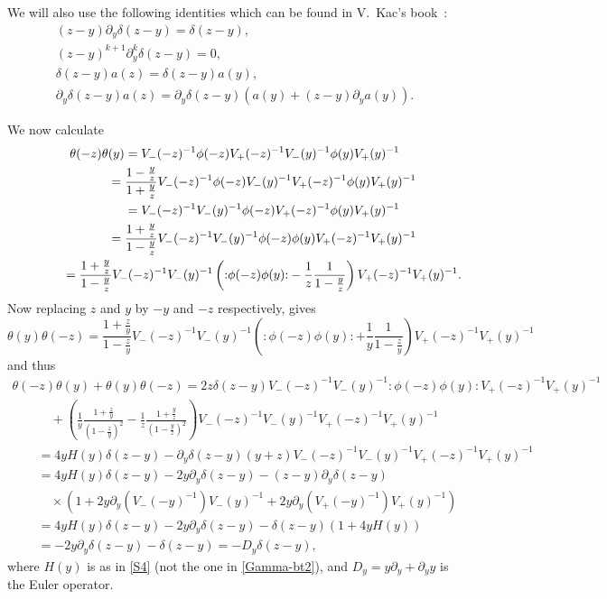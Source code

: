 We will also use the
following identities which can be found in V.~Kac's book~\cite{KacVAfB}:
\begin{gather*}
(z-y)\partial_y\delta(z-y) =\delta(z-y), \\
(z-y)^{k+1}\partial_y^{k}\delta(z-y) =0, \\
\delta(z-y)a(z) =\delta(z-y)a(y), \\
\partial_y\delta(z-y)a(z) =\partial_y\delta(z-y)\left(a(y)+(z-y)\partial_ya(y)\right).
\end{gather*}

We now calculate
\begin{gather*}
\theta(-z)\theta(y) =V_-(-z)^{-1}\phi(-z)V_+(-z)^{-1}V_-(y)^{-1}\phi(y)V_+(y)^{-1}\\
\hphantom{\theta(-z)\theta(y)}{} =\frac{1-\frac{y}{z}}{1+\frac{y}{z}}
V_-(-z)^{-1}\phi(-z)V_-(y)^{-1}V_+(-z)^{-1}\phi(y)V_+(y)^{-1}\\
\hphantom{\theta(-z)\theta(y)}{}=V_-(-z)^{-1}V_-(y)^{-1}\phi(-z)V_+(-z)^{-1}\phi(y)V_+(y)^{-1}\\
\hphantom{\theta(-z)\theta(y)}{} =\frac{1+\frac{y}{z}}{1-\frac{y}{z}}
V_-(-z)^{-1}V_-(y)^{-1}\phi(-z)\phi(y)V_+(-z)^{-1}V_+(y)^{-1}\\
\hphantom{\theta(-z)\theta(y)}{} =\frac{1+\frac{y}{z}}{1-\frac{y}{z}}
V_-(-z)^{-1}V_-(y)^{-1}\left({:}\phi(-z)\phi(y){:}-\frac{1}{z}\frac{1}{1-\frac{y}{z}}\right)
V_+(-z)^{-1}V_+(y)^{-1}.
\end{gather*}
Now replacing $z$ and $y$ by $-y$ and $-z$ respectively, gives
\[
\theta(y)\theta(-z)=\frac{1+\frac{z}{y}}{1-\frac{z}{y}}
V_-(-z)^{-1}V_-(y)^{-1}\left({:}\phi(-z)\phi(y){:}+\frac{1}{y}\frac{1}{1-\frac{z}{y}}\right)
V_+(-z)^{-1}V_+(y)^{-1}
\]
and thus
 \begin{gather}
 \theta(-z)\theta(y)+\theta(y)\theta(-z)
=
2z\delta(z-y)V_-(-z)^{-1}V_-(y)^{-1}{:}\phi(-z)\phi(y){:}
V_+(-z)^{-1}V_+(y)^{-1}\nonumber\\
\qquad\quad{} + \left( \frac 1y \frac{1+\frac{z}{y}}{(1-\frac{z}{y})^2}-\frac
1z \frac{1+\frac{y}{z}}{(1-\frac{y}{z})^2}\right)
V_-(-z)^{-1}V_-(y)^{-1} V_+(-z)^{-1}V_+(y)^{-1}\nonumber\\
\qquad {}
= 4yH(y)\delta(z-y)-\partial_y\delta(z-y)(y+z)V_-(-z)^{-1}V_-(y)^{-1}
V_+(-z)^{-1}V_+(y)^{-1}\nonumber\\
\qquad {}
= 4yH(y)\delta(z-y)-2y\partial_y\delta(z-y)
-(z-y)\partial_y\delta(z-y) \nonumber\\
\qquad\quad{}
 \times\left(1+2y\partial_y\left(V_-(-y)^{-1}\right)V_-(y)^{-1}
+2y\partial_y\left(V_+(-y)^{-1}\right)V_+(y)^{-1}\right)\nonumber\\
\qquad {}
= 4yH(y)\delta(z-y)-2y\partial_y\delta(z-y)-
\delta(z-y)\left(1+4yH(y)\right)\nonumber\\
\qquad {}
= {-2}y\partial_y\delta(z-y)-\delta(z-y)=-D_y\delta(z-y) ,\label{thetatheta-equality}
\end{gather}
where $H(y)$ is as in \eqref{S4} (not the one in \eqref{Gamma-bt2}),
and $D_y=y\partial_y+\partial_y y$ is the Euler operator.



